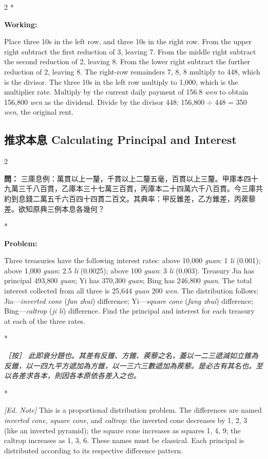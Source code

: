 \documentclass[11pt,a4paper]{article}
\newcommand{\CnQuestion}[1]{\par\noindent\textbf{\color{problemcolor}問：}#1\par\vspace{0.5ex}}
\newcommand{\CnEditorial}[1]{\par\noindent\textcolor{editorialcolor}{\textit{［按］#1}}\par\vspace{0.5ex}}
\newcommand{\EnQuestion}{\par\noindent\textbf{\color{problemcolor}Problem:}\par\vspace{0.5ex}}
\newcommand{\EnWorking}{\par\noindent\textbf{Working:}\par\vspace{0.5ex}}
\newcommand{\EnEditorial}{\par\noindent\textcolor{editorialcolor}{\textit{[Ed. Note] }}\ignorespaces}
\newcommand{\switchCn}{\switchcolumn[0]*}
\newcommand{\switchEn}{\switchcolumn[1]*}
\begin{document}
\begin{paracol}{2}
\switchEn

\EnWorking
Place three 10s in the left row, and three 10s in the right row. From the upper right subtract the first reduction of 3, leaving 7. From the middle right subtract the second reduction of 2, leaving 8. From the lower right subtract the further reduction of 2, leaving 8. The right-row remainders 7, 8, 8 multiply to 448, which is the divisor. The three 10s in the left row multiply to 1,000, which is the multiplier rate. Multiply by the current daily payment of 156.8 \textit{wen} to obtain 156,800 \textit{wen} as the dividend. Divide by the divisor 448: 156,800 $\div$ 448 = 350 \textit{wen}, the original rent.

\end{paracol}

\vspace{1.5em}

\subsection*{推求本息 \quad Calculating Principal and Interest}

\begin{paracol}{2}

\CnQuestion{%
三庫息例：萬貫以上一釐，千貫以上二釐五毫，百貫以上三釐。甲庫本四十九萬三千八百貫，乙庫本三十七萬三百貫，丙庫本二十四萬六千八百貫。今三庫共約到息錢二萬五千六百四十四貫二百文。其典率：甲反錐差，乙方錐差，丙蒺藜差。欲知原典三例本息各幾何？
}

\switchEn

\EnQuestion
Three treasuries have the following interest rates: above 10,000 \textit{guan}: 1 \textit{li} (0.001); above 1,000 \textit{guan}: 2.5 \textit{li} (0.0025); above 100 \textit{guan}: 3 \textit{li} (0.003). Treasury Jia has principal 493,800 \textit{guan}; Yi has 370,300 \textit{guan}; Bing has 246,800 \textit{guan}. The total interest collected from all three is 25,644 \textit{guan} 200 \textit{wen}. The distribution follows: Jia---\textit{inverted cone} (\textit{fan zhui}) difference; Yi---\textit{square cone} (\textit{fang zhui}) difference; Bing---\textit{caltrop} (\textit{ji li}) difference. Find the principal and interest for each treasury at each of the three rates.

\switchCn

\CnEditorial{%
此即衰分題也。其差有反錐、方錐、蒺藜之名，蓋以一二三遞減如立錐為反錐，以一四九平方遞加為方錐，以一三六三數遞加為蒺藜。是必古有其名也。至以各差求各本，則因各本原依各差入之也。
}

\switchEn

\EnEditorial
This is a proportional distribution problem. The differences are named \textit{inverted cone}, \textit{square cone}, and \textit{caltrop}: the inverted cone decreases by 1, 2, 3 (like an inverted pyramid); the square cone increases as squares 1, 4, 9; the caltrop increases as 1, 3, 6. These names must be classical. Each principal is distributed according to its respective difference pattern.

\end{paracol}
\end{document}
